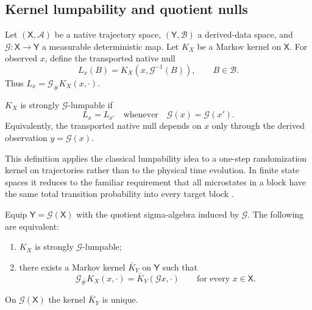\subsection{Kernel lumpability and quotient nulls}\label{sec:lumpability}

Let $(\mathsf X,\mathcal A)$ be a native trajectory space, $(\mathsf Y,\mathcal B)$ a derived-data space, and $\mathcal G:\mathsf X\to\mathsf Y$ a measurable deterministic map. Let $K_X$ be a Markov kernel on $\mathsf X$. For observed $x$, define the transported native null
\begin{equation}
L_x(B)=K_X\!\left(x,\mathcal G^{-1}(B)\right),\qquad B\in\mathcal B.
\label{eq:transport}
\end{equation}
Thus $L_x=\mathcal G_\#K_X(x,\cdot)$.

\begin{definition}
$K_X$ is strongly $\mathcal G$-lumpable if
\begin{equation}
L_x=L_{x'}\quad\text{whenever}\quad \mathcal G(x)=\mathcal G(x').
\label{eq:lumpability}
\end{equation}
Equivalently, the transported native null depends on $x$ only through the derived observation $y=\mathcal G(x)$.
\end{definition}

This definition applies the classical lumpability idea to a one-step randomization kernel on trajectories rather than to the physical time evolution. In finite state spaces it reduces to the familiar requirement that all microstates in a block have the same total transition probability into every target block \cite{KemenySnell1976,Buchholz1994}.

\begin{proposition}\label{prop:quotient}
Equip $\mathsf Y=\mathcal G(\mathsf X)$ with the quotient sigma-algebra induced by $\mathcal G$. The following are equivalent:
\begin{enumerate}
\item $K_X$ is strongly $\mathcal G$-lumpable;
\item there exists a Markov kernel $\bar K_Y$ on $\mathsf Y$ such that
\begin{equation}
\mathcal G_\#K_X(x,\cdot)=\bar K_Y(\mathcal Gx,\cdot)
\qquad\text{for every }x\in\mathsf X.
\label{eq:quotient}
\end{equation}
\end{enumerate}
On $\mathcal G(\mathsf X)$ the kernel $\bar K_Y$ is unique.
\end{proposition}

